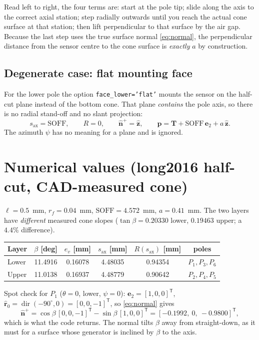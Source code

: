 \documentclass[12pt]{article}
\newcommand{\ehat}[1]{\mathbf{e}_{#1}}
\newcommand{\rhat}{\hat{\mathbf{r}}}
\newcommand{\nhat}{\hat{\mathbf{n}}}
\newcommand{\dir}{\operatorname{dir}}
\begin{document}
Read left to right, the four terms are: start at the pole tip; slide along the axis to
the correct axial station; step radially outwards until you reach the actual cone
surface at that station; then lift perpendicular to that surface by the air gap.
Because the last step uses the true surface normal \eqref{eq:normal}, the perpendicular
distance from the sensor centre to the cone surface is \emph{exactly} $a$ by
construction.

\subsection*{Degenerate case: flat mounting face}

For the lower pole the option \texttt{face\_lower='flat'} mounts the sensor on the
half-cut plane instead of the bottom cone. That plane \emph{contains} the pole axis,
so there is no radial stand-off and no slant projection:
\begin{equation}
s_{\mathrm{ax}}=\mathrm{SOFF},\qquad R=0,\qquad \nhat^{+}=\hat{\mathbf{z}},
\qquad \mathbf{p}=\mathbf{T}+\mathrm{SOFF}\,\ehat{2}+a\,\hat{\mathbf{z}} .
\end{equation}
The azimuth $\psi$ has no meaning for a plane and is ignored.

\section{Numerical values (long2016 half-cut, CAD-measured cone)}
\label{sec:num}

$\ell=0.5$~mm, $r_f=0.04$~mm, $\mathrm{SOFF}=4.572$~mm, $a=0.41$~mm.
The two layers have \emph{different} measured cone slopes
($\tan\beta=0.20330$ lower, $0.19463$ upper; a $4.4\%$ difference).

\begin{center}
\begin{tabular}{lccccc}
\toprule
Layer & $\beta$ [deg] & $e_v$ [mm] & $s_{\mathrm{ax}}$ [mm] & $R(s_{\mathrm{ax}})$ [mm] & poles \\
\midrule
Lower & 11.4916 & 0.16078 & 4.48035 & 0.94354 & $P_1,P_3,P_6$ \\
Upper & 11.0138 & 0.16937 & 4.48779 & 0.90642 & $P_2,P_4,P_5$ \\
\bottomrule
\end{tabular}
\end{center}

Spot check for $P_1$ ($\theta=0$, lower, $\psi=0$): $\ehat{2}=[1,0,0]^{\mathsf T}$,
$\rhat_0=\dir(-90^\circ,0)=[0,0,-1]^{\mathsf T}$, so \eqref{eq:normal} gives
\[
\nhat^{+}=\cos\beta\,[0,0,-1]^{\mathsf T}-\sin\beta\,[1,0,0]^{\mathsf T}
=[-0.1992,\ 0,\ -0.9800]^{\mathsf T},
\]
which is what the code returns. The normal tilts $\beta$ away from straight-down,
as it must for a surface whose generator is inclined by $\beta$ to the axis.
\end{document}
